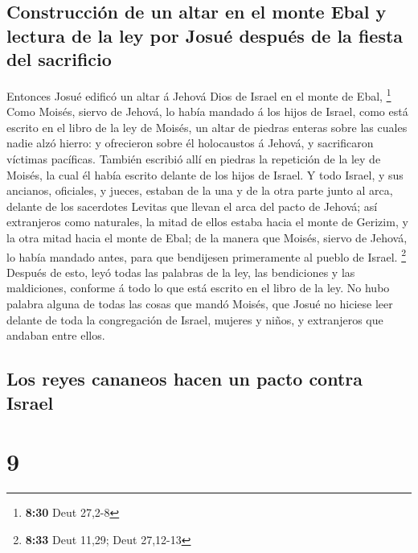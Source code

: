 \hypertarget{construcciuxf3n-de-un-altar-en-el-monte-ebal-y-lectura-de-la-ley-por-josuuxe9-despuuxe9s-de-la-fiesta-del-sacrificio}{%
\subsection{Construcción de un altar en el monte Ebal y lectura de la
ley por Josué después de la fiesta del
sacrificio}\label{construcciuxf3n-de-un-altar-en-el-monte-ebal-y-lectura-de-la-ley-por-josuuxe9-despuuxe9s-de-la-fiesta-del-sacrificio}}

 Entonces Josué edificó un altar á Jehová Dios de Israel en
el monte de Ebal, \footnote{\textbf{8:30} Deut 27,2-8} 
Como Moisés, siervo de Jehová, lo había mandado á los hijos de Israel,
como está escrito en el libro de la ley de Moisés, un altar de piedras
enteras sobre las cuales nadie alzó hierro: y ofrecieron sobre él
holocaustos á Jehová, y sacrificaron víctimas pacíficas. 
También escribió allí en piedras la repetición de la ley de Moisés, la
cual él había escrito delante de los hijos de Israel.  Y
todo Israel, y sus ancianos, oficiales, y jueces, estaban de la una y de
la otra parte junto al arca, delante de los sacerdotes Levitas que
llevan el arca del pacto de Jehová; así extranjeros como naturales, la
mitad de ellos estaba hacia el monte de Gerizim, y la otra mitad hacia
el monte de Ebal; de la manera que Moisés, siervo de Jehová, lo había
mandado antes, para que bendijesen primeramente al pueblo de Israel.
\footnote{\textbf{8:33} Deut 11,29; Deut 27,12-13}  Después
de esto, leyó todas las palabras de la ley, las bendiciones y las
maldiciones, conforme á todo lo que está escrito en el libro de la ley.
 No hubo palabra alguna de todas las cosas que mandó
Moisés, que Josué no hiciese leer delante de toda la congregación de
Israel, mujeres y niños, y extranjeros que andaban entre ellos.

\hypertarget{los-reyes-cananeos-hacen-un-pacto-contra-israel}{%
\subsection{Los reyes cananeos hacen un pacto contra
Israel}\label{los-reyes-cananeos-hacen-un-pacto-contra-israel}}

\hypertarget{section-8}{%
\section{9}\label{section-8}}

